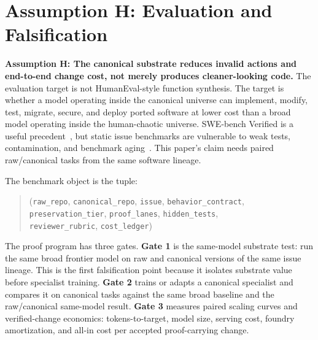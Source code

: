 \section{Assumption H: Evaluation and Falsification}
\label{sec:eval}

\textbf{Assumption H: The canonical substrate reduces invalid actions and end-to-end change cost, not merely produces cleaner-looking code.} The evaluation target is not HumanEval-style function synthesis. The target is whether a model operating inside the canonical universe can implement, modify, test, migrate, secure, and deploy ported software at lower cost than a broad model operating inside the human-chaotic universe. SWE-bench Verified is a useful precedent~\cite{swebench,swebenchVerified}, but static issue benchmarks are vulnerable to weak tests, contamination, and benchmark aging~\cite{utboost,sweRebench,openaiSwebenchVerifiedCritique}. This paper's claim needs paired raw/canonical tasks from the same software lineage.

The benchmark object is the tuple:
\begin{quote}
\footnotesize
(\texttt{raw\_repo}, \texttt{canonical\_repo}, \texttt{issue}, \texttt{behavior\_contract},\\
\texttt{preservation\_tier}, \texttt{proof\_lanes}, \texttt{hidden\_tests},\\
\texttt{reviewer\_rubric}, \texttt{cost\_ledger})
\end{quote}

The proof program has three gates. \textbf{Gate 1} is the same-model substrate test: run the same broad frontier model on raw and canonical versions of the same issue lineage. This is the first falsification point because it isolates substrate value before specialist training. \textbf{Gate 2} trains or adapts a canonical specialist and compares it on canonical tasks against the same broad baseline and the raw/canonical same-model result. \textbf{Gate 3} measures paired scaling curves and verified-change economics: tokens-to-target, model size, serving cost, foundry amortization, and all-in cost per accepted proof-carrying change.


